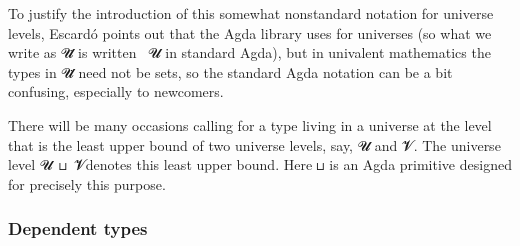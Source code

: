 
To justify the introduction of this somewhat nonstandard notation for universe levels, Escardó points out that the Agda library uses  for universes (so what we write as \ab 𝓤\af ̇ is written ~\ab 𝓤 in standard Agda), but in univalent mathematics the types in \ab 𝓤\af ̇ need not be sets, so the standard Agda notation can be
a bit confusing, especially to newcomers.

There will be many occasions calling for a type living in a universe at the level that is the least upper bound of two universe levels, say, \ab 𝓤 and \ab 𝓥. The universe level \ab 𝓤~\apr ⊔~\ab 𝓥\af denotes this least upper bound. Here \apr ⊔ is an Agda primitive designed for precisely this purpose.


\subsubsection{Dependent types}\label{sec:dependent-types}

\newcommand\FstUnder{\AgdaOperator{\AgdaFunction{∣\AgdaUnderscore{}∣}}\xspace}
\newcommand\SndUnder{\AgdaOperator{\AgdaFunction{∥\AgdaUnderscore{}∥}}\xspace}








